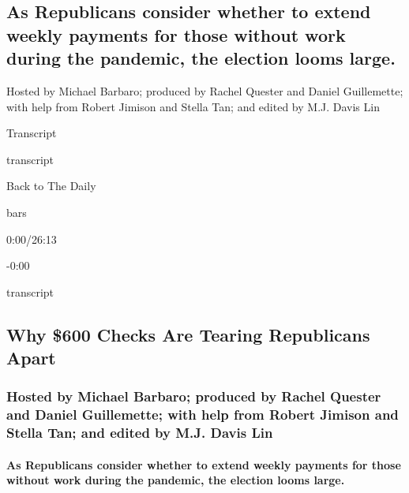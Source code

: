 \hypertarget{as-republicans-consider-whether-to-extend-weekly-payments-for-those-without-work-during-the-pandemic-the-election-looms-large-1}{%
\subsection{As Republicans consider whether to extend weekly payments
for those without work during the pandemic, the election looms
large.}\label{as-republicans-consider-whether-to-extend-weekly-payments-for-those-without-work-during-the-pandemic-the-election-looms-large-1}}

Hosted by Michael Barbaro; produced by Rachel Quester and Daniel
Guillemette; with help from Robert Jimison and Stella Tan; and edited by
M.J. Davis Lin

Transcript

transcript

Back to The Daily

bars

0:00/26:13

-0:00

transcript

\hypertarget{why-600-checks-are-tearing-republicans-apart-2}{%
\subsection{Why \$600 Checks Are Tearing Republicans
Apart}\label{why-600-checks-are-tearing-republicans-apart-2}}

\hypertarget{hosted-by-michael-barbaro-produced-by-rachel-quester-and-daniel-guillemette-with-help-from-robert-jimison-and-stella-tan-and-edited-by-mj-davis-lin-1}{%
\subsubsection{Hosted by Michael Barbaro; produced by Rachel Quester and
Daniel Guillemette; with help from Robert Jimison and Stella Tan; and
edited by M.J. Davis
Lin}\label{hosted-by-michael-barbaro-produced-by-rachel-quester-and-daniel-guillemette-with-help-from-robert-jimison-and-stella-tan-and-edited-by-mj-davis-lin-1}}

\hypertarget{as-republicans-consider-whether-to-extend-weekly-payments-for-those-without-work-during-the-pandemic-the-election-looms-large-2}{%
\paragraph{As Republicans consider whether to extend weekly payments for
those without work during the pandemic, the election looms
large.}\label{as-republicans-consider-whether-to-extend-weekly-payments-for-those-without-work-during-the-pandemic-the-election-looms-large-2}}

